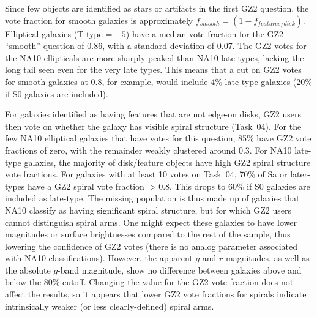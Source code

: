 \documentclass[useAMS,usenatbib]{mn2e}
\begin{document}
Since few objects are identified as stars or artifacts in the first GZ2 question, the vote fraction for smooth galaxies is approximately $f_{smooth} = (1 - f_{features/disk})$. Elliptical galaxies (T-type = $-5$) have a median vote fraction for the GZ2 ``smooth'' question of 0.86, with a standard deviation of 0.07. The GZ2 votes for the NA10 ellipticals are more sharply peaked than NA10 late-types, lacking the long tail seen even for the very late types. This means that a cut on GZ2 votes for smooth galaxies at 0.8, for example, would include 4\% late-type galaxies (20\% if S0 galaxies are included). 

For galaxies identified as having features that are not edge-on disks, GZ2 users then vote on whether the galaxy has visible spiral structure (Task~04). For the few NA10 elliptical galaxies that have votes for this question, 85\% have GZ2 vote fractions of zero, with the remainder weakly clustered around 0.3. For NA10 late-type galaxies, the majority of disk/feature objects have high GZ2 spiral structure vote fractions. For galaxies with at least 10 votes on Task~04, 70\% of Sa or later-types have a GZ2 spiral vote fraction $>0.8$. This drops to 60\% if S0 galaxies are included as late-type. The missing population is thus made up of galaxies that NA10 classify as having significant spiral structure, but for which GZ2 users cannot distinguish spiral arms. One might expect these galaxies to have lower magnitudes or surface brightnesses compared to the rest of the sample, thus lowering the confidence of GZ2 votes (there is no analog parameter associated with NA10 classifications). However, the apparent $g$ and $r$ magnitudes, as well as the absolute $g$-band magnitude, show no difference between galaxies above and below the 80\% cutoff. Changing the value for the GZ2 vote fraction does not affect the results, so it appears that lower GZ2 vote fractions for spirals indicate intrinsically weaker (or less clearly-defined) spiral arms.
\end{document}
